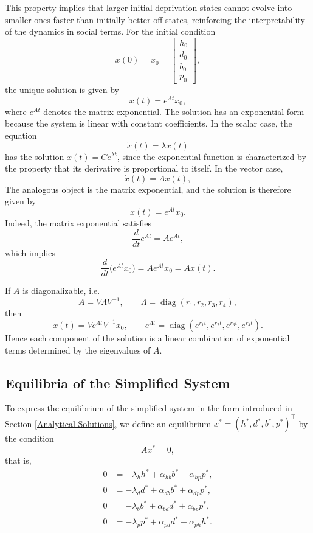 \documentclass[11pt,a4paper]{article}
\begin{document}
This property implies that larger initial deprivation states cannot evolve into
smaller ones faster than initially better-off states, reinforcing the
interpretability of the dynamics in social terms.
For the initial condition
\[
x(0)=x_0=
\begin{bmatrix}
h_0\\ d_0\\ b_0\\ p_0
\end{bmatrix},
\]
the unique solution is given by
\[
x(t)=e^{At}x_0,
\]
where \(e^{At}\) denotes the matrix exponential. 
The solution has an exponential form because the system is linear with constant coefficients. In the scalar case, the equation
\[
\dot{x}(t)=\lambda x(t)
\]
has the solution \(x(t)=Ce^{\lambda t}\), since the exponential function is characterized by the property that its derivative is proportional to itself. In the vector case,
\[
\dot{x}(t)=Ax(t),
\]
The analogous object is the matrix exponential, and the solution is therefore given by
\[
x(t)=e^{At}x_0.
\]
Indeed, the matrix exponential satisfies
\[
\frac{d}{dt}e^{At}=Ae^{At},
\]
which implies
\[
\frac{d}{dt}\bigl(e^{At}x_0\bigr)=Ae^{At}x_0=Ax(t).
\]

If \(A\) is diagonalizable, i.e.
\[
A=V\Lambda V^{-1},
\qquad
\Lambda=\operatorname{diag}(r_1,r_2,r_3,r_4),
\]
then
\[
x(t)=V e^{\Lambda t} V^{-1}x_0,
\qquad
e^{\Lambda t}=\operatorname{diag}(e^{r_1 t},e^{r_2 t},e^{r_3 t},e^{r_4 t}).
\]
Hence each component of the solution is a linear combination of exponential terms determined by the eigenvalues of \(A\).

\subsection{Equilibria of the Simplified System}

To express the equilibrium of the simplified system in the form introduced in Section \ref{Analytical Solutions}, we define an equilibrium \(x^*=(h^*,d^*,b^*,p^*)^\top\) by the condition
\[
Ax^*=0,
\]
that is,
\begin{align}
0 &= -\lambda_h h^* + \alpha_{hb} b^* + \alpha_{hp} p^*,\\
0 &= -\lambda_d d^* + \alpha_{db} b^* + \alpha_{dp} p^*,\\
0 &= -\lambda_b b^* + \alpha_{bd} d^* + \alpha_{bp} p^*,\\
0 &= -\lambda_p p^* + \alpha_{pd} d^* + \alpha_{ph} h^*.
\end{align}
\end{document}
